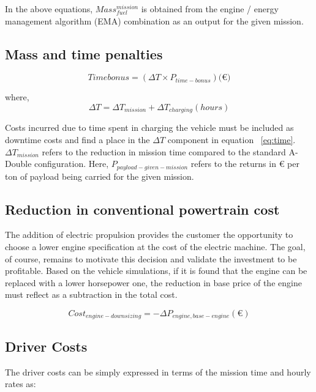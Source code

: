 \documentclass[ExampleMasters.tex]{subfiles}
\begin{document}
			In the above equations, $Mass_{fuel}^{mission}$ is obtained from the engine / energy management algorithm (EMA) combination as an output for the given mission.

		\subsection{Mass and time penalties}

			\begin{equation} \label{eq:time}
				Time bonus = (\Delta T \times P_{time-bonus}) (\euro{)}
			\end{equation}

			where,
			\begin{equation}
				\Delta T = \Delta T_{mission}+\Delta T_{charging} (hours)
			\end{equation}

			Costs incurred due to time spent in charging the vehicle must be included as downtime costs and find a place in the $\Delta T$ component in equation ~\ref{eq:time}. $\Delta T_{mission}$ refers to the reduction in mission time compared to the standard A-Double configuration. Here, $P_{payload-given-mission}$ refers to the returns in \euro{} per ton of payload being carried for the given mission. 

		\subsection{Reduction in conventional powertrain cost}
			The addition of electric propulsion provides the customer the opportunity to choose a lower engine specification at the cost of the electric machine. The goal, of course, remains to motivate this decision and validate the investment to be profitable. Based on the vehicle simulations, if it is found that the engine can be replaced with a lower horsepower one, the reduction in base price of the engine must reflect as a subtraction in the total cost.

			\begin{equation}
				Cost_{engine-downsizing} = -\Delta P_{engine,base-engine} (\euro{})
			\end{equation}

		\subsection{Driver Costs}
			The driver costs can be simply expressed in terms of the mission time and hourly rates as:
\end{document}
